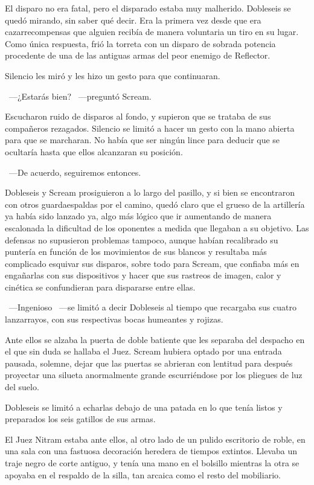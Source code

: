 El disparo no era fatal, pero el disparado estaba muy malherido. Dobleseis se quedó mirando, sin saber qué decir. Era la primera vez desde que era cazarrecompensas que alguien recibía de manera voluntaria un tiro en su lugar. Como única respuesta, frió la torreta con un disparo de sobrada potencia procedente de una de las antiguas armas del peor enemigo de Reflector.

Silencio les miró y les hizo un gesto para que continuaran.

~---¿Estarás bien? ~---preguntó Scream.

Escucharon ruido de disparos al fondo, y supieron que se trataba de sus compañeros rezagados. Silencio se limitó a hacer un gesto con la mano abierta para que se marcharan. No había que ser ningún lince para deducir que se ocultaría hasta que ellos alcanzaran su posición.

~---De acuerdo, seguiremos entonces.

Dobleseis y Scream prosiguieron a lo largo del pasillo, y si bien se encontraron con otros guardaespaldas por el camino, quedó claro que el grueso de la artillería ya había sido lanzado ya, algo más lógico que ir aumentando de manera escalonada la dificultad de los oponentes a medida que llegaban a su objetivo. Las defensas no supusieron problemas tampoco, aunque habían recalibrado su puntería en función de los movimientos de sus blancos y resultaba más complicado esquivar sus disparos, sobre todo para Scream, que confiaba más en engañarlas con sus dispositivos y hacer que sus rastreos de imagen, calor y cinética se confundieran para dispararse entre ellas.

~---Ingenioso ~---se limitó a decir Dobleseis al tiempo que recargaba sus cuatro lanzarrayos, con sus respectivas bocas humeantes y rojizas.

Ante ellos se alzaba la puerta de doble batiente que les separaba del despacho en el que sin duda se hallaba el Juez. Scream hubiera optado por una entrada pausada, solemne, dejar que las puertas se abrieran con lentitud para después proyectar una silueta anormalmente grande escurriéndose por los pliegues de luz del suelo.

Dobleseis se limitó a echarlas debajo de una patada en lo que tenía listos y preparados los seis gatillos de sus armas.

El Juez Nitram estaba ante ellos, al otro lado de un pulido escritorio de roble, en una sala con una fastuosa decoración heredera de tiempos extintos. Llevaba un traje negro de corte antiguo, y tenía una mano en el bolsillo mientras la otra se apoyaba en el respaldo de la silla, tan arcaica como el resto del mobiliario.

